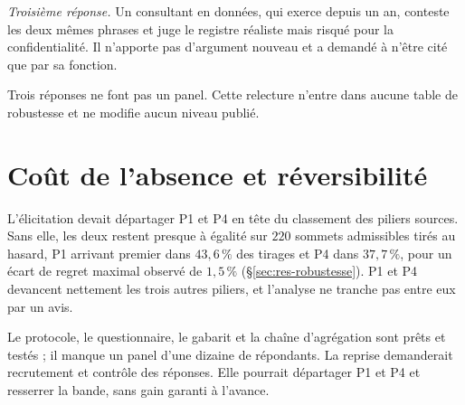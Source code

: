 \emph{Troisième réponse.} Un consultant en données, qui exerce depuis un an, conteste les deux mêmes
phrases et juge le registre réaliste mais risqué pour la confidentialité. Il n'apporte pas d'argument
nouveau et a demandé à n'être cité que par sa fonction.

Trois réponses ne font pas un panel. Cette relecture n'entre dans aucune table de robustesse et ne
modifie aucun niveau publié.

\section{Coût de l'absence et réversibilité}

L'élicitation devait départager P1 et P4 en tête du classement des piliers sources. Sans elle, les
deux restent presque à égalité sur $220$ sommets admissibles tirés au hasard, P1 arrivant premier dans
$43{,}6\,\%$ des tirages et P4 dans $37{,}7\,\%$, pour un écart de regret maximal observé de $1{,}5\,\%$
(\S\ref{sec:res-robustesse}). P1 et P4 devancent nettement les trois autres piliers, et l'analyse ne
tranche pas entre eux par un avis.

Le protocole, le questionnaire, le gabarit et la chaîne d'agrégation sont prêts et testés ; il manque
un panel d'une dizaine de répondants. La reprise demanderait recrutement et contrôle des réponses. Elle pourrait départager P1 et P4 et resserrer la bande, sans gain garanti à l'avance.
